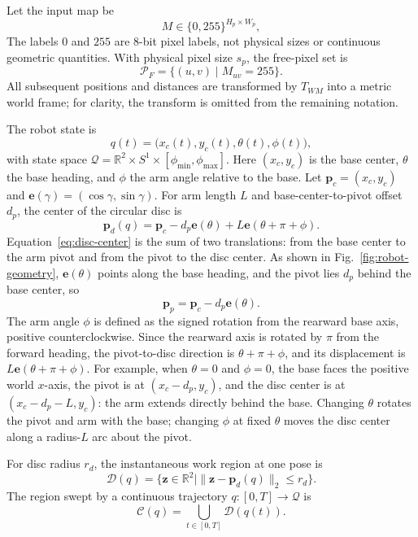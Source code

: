Let the input map be
\begin{equation*}
M\in\{0,255\}^{H_p\times W_p},
\end{equation*}
The labels $0$ and $255$ are 8-bit pixel labels, not physical sizes or continuous geometric quantities. With physical pixel size $s_p$, the free-pixel set is
\begin{equation*}
\mathcal P_F=\{(u,v)\mid M_{uv}=255\}.
\end{equation*}
All subsequent positions and distances are transformed by $T_{WM}$ into a metric world frame; for clarity, the transform is omitted from the remaining notation.

The robot state is
\begin{equation*}
q(t)=\bigl(x_c(t),y_c(t),\theta(t),\phi(t)\bigr),
\end{equation*}
with state space $\mathcal Q=\mathbb R^2\times S^1\times[\phi_{\min},\phi_{\max}]$. Here $(x_c,y_c)$ is the base center, $\theta$ the base heading, and $\phi$ the arm angle relative to the base. Let $\mathbf p_c=(x_c,y_c)$ and $\mathbf e(\gamma)=(\cos\gamma,\sin\gamma)$. For arm length $L$ and base-center-to-pivot offset $d_p$, the center of the circular disc is
\begin{equation}
\mathbf p_d(q)=\mathbf p_c-d_p\mathbf e(\theta)+L\mathbf e(\theta+\pi+\phi).
\tag{1}
\label{eq:disc-center}
\end{equation}
Equation~\eqref{eq:disc-center} is the sum of two translations: from the base center to the arm pivot and from the pivot to the disc center. As shown in Fig.~\ref{fig:robot-geometry}, $\mathbf e(\theta)$ points along the base heading, and the pivot lies $d_p$ behind the base center, so
\begin{equation*}
\mathbf p_p=\mathbf p_c-d_p\mathbf e(\theta).
\end{equation*}
The arm angle $\phi$ is defined as the signed rotation from the rearward base axis, positive counterclockwise. Since the rearward axis is rotated by $\pi$ from the forward heading, the pivot-to-disc direction is $\theta+\pi+\phi$, and its displacement is $L\mathbf e(\theta+\pi+\phi)$. For example, when $\theta=0$ and $\phi=0$, the base faces the positive world $x$-axis, the pivot is at $(x_c-d_p,y_c)$, and the disc center is at $(x_c-d_p-L,y_c)$: the arm extends directly behind the base. Changing $\theta$ rotates the pivot and arm with the base; changing $\phi$ at fixed $\theta$ moves the disc center along a radius-$L$ arc about the pivot.

For disc radius $r_d$, the instantaneous work region at one pose is
\begin{equation}
\mathcal D(q)=\{\mathbf z\in\mathbb R^2\mid\|\mathbf z-\mathbf p_d(q)\|_2\le r_d\}.
\tag{2}
\label{eq:instantaneous-disc}
\end{equation}
The region swept by a continuous trajectory $q:[0,T]\rightarrow\mathcal Q$ is
\begin{equation}
\mathcal C(q)=\bigcup_{t\in[0,T]}\mathcal D(q(t)).
\tag{3}
\label{eq:swept-area}
\end{equation}

